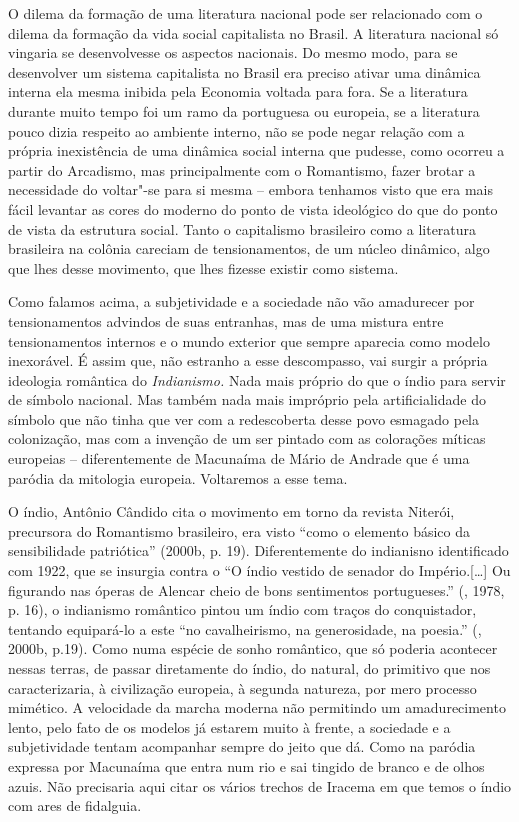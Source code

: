 O dilema da formação de uma literatura nacional pode ser relacionado com
o dilema da formação da vida social capitalista no Brasil. A literatura
nacional só vingaria se desenvolvesse os aspectos nacionais. Do mesmo
modo, para se desenvolver um sistema capitalista no Brasil era preciso
ativar uma dinâmica interna ela mesma inibida pela Economia voltada para
fora. Se a literatura durante muito tempo foi um ramo da portuguesa ou
europeia, se a literatura pouco dizia respeito ao ambiente interno, não
se pode negar relação com a própria inexistência de uma dinâmica social
interna que pudesse, como ocorreu a partir do Arcadismo, mas
principalmente com o Romantismo, fazer brotar a necessidade do voltar"-se
para si mesma -- embora tenhamos visto que era mais fácil levantar as
cores do moderno do ponto de vista ideológico do que do ponto de vista
da estrutura social. Tanto o capitalismo brasileiro como a literatura
brasileira na colônia careciam de tensionamentos, de um núcleo dinâmico,
algo que lhes desse movimento, que lhes fizesse existir como sistema.

Como falamos acima, a subjetividade e a sociedade não vão amadurecer por
tensionamentos advindos de suas entranhas, mas de uma mistura entre
tensionamentos internos e o mundo exterior que sempre aparecia como
modelo inexorável. É assim que, não estranho a esse descompasso, vai
surgir a própria ideologia romântica do \emph{Indianismo.} Nada mais
próprio do que o índio para servir de símbolo nacional. Mas também nada
mais impróprio pela artificialidade do símbolo que não tinha que ver com
a redescoberta desse povo esmagado pela colonização, mas com a invenção
de um ser pintado com as colorações míticas europeias -- diferentemente
de Macunaíma de Mário de Andrade que é uma paródia da mitologia
europeia. Voltaremos a esse tema.

O índio, Antônio Cândido cita o movimento em torno da revista Niterói,
precursora do Romantismo brasileiro, era visto ``como o elemento básico
da sensibilidade patriótica'' (2000b, p. 19). Diferentemente do
indianisno identificado com 1922, que se insurgia contra o ``O índio
vestido de senador do Império.[\ldots{}] Ou figurando nas óperas de
Alencar cheio de bons sentimentos portugueses.'' (, 1978, p. 16),
o indianismo romântico pintou um índio com traços do conquistador,
tentando equipará-lo a este ``no cavalheirismo, na generosidade, na
poesia.'' (, 2000b, p.19). Como numa espécie de sonho romântico,
que só poderia acontecer nessas terras, de passar diretamente do índio,
do natural, do primitivo que nos caracterizaria, à civilização europeia,
à segunda natureza, por mero processo mimético. A velocidade da marcha
moderna não permitindo um amadurecimento lento, pelo fato de os modelos
já estarem muito à frente, a sociedade e a subjetividade tentam
acompanhar sempre do jeito que dá. Como na paródia expressa por
Macunaíma que entra num rio e sai tingido de branco e de olhos azuis.
Não precisaria aqui citar os vários trechos de Iracema em que temos o
índio com ares de fidalguia.

